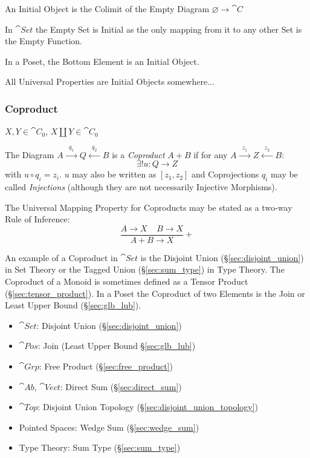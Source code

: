 An Initial Object is the Colimit of the Empty Diagram $\varnothing
\rightarrow \cat{C}$

In $\cat{Set}$ the Empty Set is Initial as the only mapping from it
to any other Set is the Empty Function.

In a Poset, the Bottom Element is an Initial Object.

All Universal Properties are Initial Objects somewhere...



\subsubsection{Coproduct}\label{sec:coproduct}

$X,Y \in \cat{C}_0$, $X \amalg Y \in \cat{C}_0$

The Diagram $A \xrightarrow{\;\;q_1\;\;} Q \xleftarrow{\;\;q_2\;\;} B$
is a \emph{Coproduct} $A + B$ if for any $A \xrightarrow{\;\;z_1\;\;}
Z \xleftarrow{\;\;z_2\;\;} B$:
\[
  \exists!u : Q \rightarrow Z
\]
with $u \circ q_i = z_i$. $u$ may also be written as $[ z_1, z_2 ]$
and Coprojections $q_i$ may be called \emph{Injections} (although they
are not necessarily Injective Morphisms).

The Universal Mapping Property for Coproducts may be stated as a
two-way Rule of Inference:
\[
  {
    \frac{A \rightarrow X \;\;\;\; B \rightarrow X}
    {A + B \rightarrow X}
  }+
\]

An example of a Coproduct in $\cat{Set}$ is the Disjoint Union
(\S\ref{sec:disjoint_union}) in Set Theory or the Tagged Union
(\S\ref{sec:sum_type}) in Type Theory. The Coproduct of a Monoid is
sometimes defined as a Tensor Product (\S\ref{sec:tensor_product}). In
a Poset the Coproduct of two Elements is the Join or Least Upper Bound
(\S\ref{sec:glb_lub}).

\begin{itemize}
\item $\cat{Set}$: Disjoint Union (\S\ref{sec:disjoint_union})
\item $\cat{Pos}$: Join (Least Upper Bound \S\ref{sec:glb_lub})
\item $\cat{Grp}$: Free Product (\S\ref{sec:free_product})
\item $\cat{Ab}$, $\cat{Vect}$: Direct Sum (\S\ref{sec:direct_sum})
\item $\cat{Top}$: Disjoint Union Topology
  (\S\ref{sec:disjoint_union_topology})
\item Pointed Spaces: Wedge Sum (\S\ref{sec:wedge_sum})
\item Type Theory: Sum Type (\S\ref{sec:sum_type})
\end{itemize}

